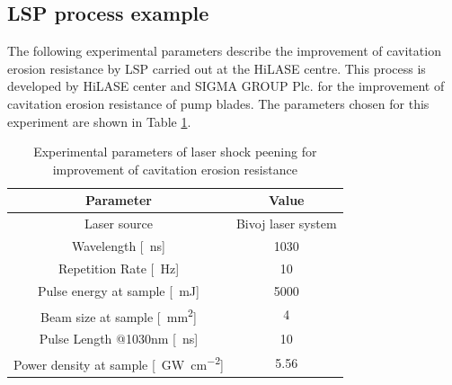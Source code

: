 \subsection{LSP process example}

The following experimental parameters describe the improvement of cavitation erosion resistance by LSP carried out at the HiLASE centre. This process is developed by HiLASE center and SIGMA GROUP Plc. for the improvement of cavitation erosion resistance of pump blades. The parameters chosen for this experiment are shown in Table \ref{experimentalparameters}. 

\begin{table}[h!]
\centering
    \begin{threeparttable}
        \begin{tabular}{|c | c|} 
        \hline
            \textbf{Parameter} & \textbf{Value} \\ [0.5ex] 
        \hline
        Laser source & Bivoj laser system  \\
        \hline
        Wavelength [\SI{}{\nano\second}] & 1030 \\
        \hline
        Repetition Rate [\SI{}{\hertz}] & 10  \\ 
        \hline
            Pulse energy at sample [\SI{}{\milli\joule}] & 5000 \\
        \hline
            Beam size at sample [\SI{}{\mm\squared}] & 4 \\
        \hline
            Pulse Length @1030nm [\SI{}{\nano\second}] & 10 \\
        \hline
            Power density at sample [\SI{}{\giga\watt\per\cm\squared}] & 5.56 \\

        \hline
        \end{tabular}

        \caption{Experimental parameters of laser shock peening for improvement of cavitation erosion resistance}
        \label{experimentalparameters}
    \end{threeparttable}
\end{table}


